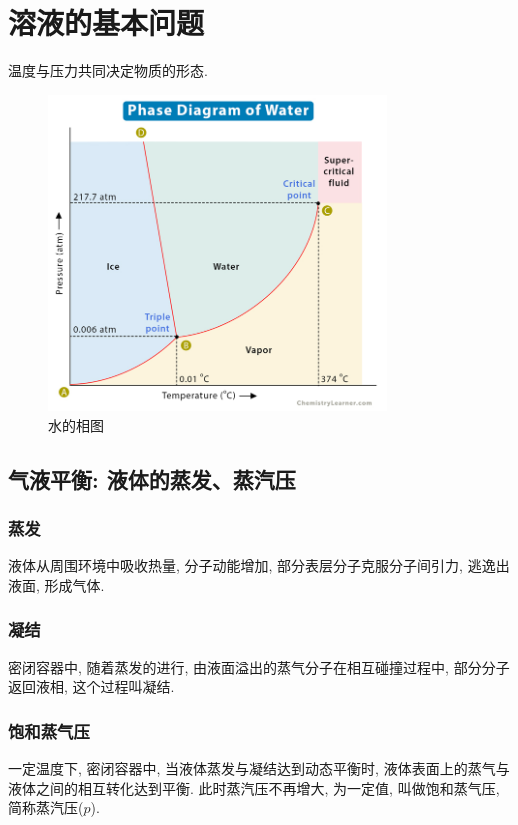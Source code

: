 \documentclass[12pt, a4paper, oneside]{ctexbook}
\begin{document}
\section{溶液的基本问题}
温度与压力共同决定物质的形态. \\
\begin{figure}[htbp]
    \centering
    \includegraphics[width=0.8\textwidth]{pics/phase_diagram.jpg}
    \caption{水的相图}
\end{figure}
\subsection{气液平衡: 液体的蒸发、蒸汽压}
\subsubsection{蒸发}
液体从周围环境中吸收热量, 分子动能增加, 部分表层分子克服分子间引力, 逃逸出液面, 形成气体. 
\subsubsection{凝结}
密闭容器中, 随着蒸发的进行, 由液面溢出的蒸气分子在相互碰撞过程中, 部分分子返回液相, 这个过程叫凝结. 
\subsubsection{饱和蒸气压}
一定温度下, 密闭容器中, 当液体蒸发与凝结达到动态平衡时, 液体表面上的蒸气与液体之间的相互转化达到平衡. 此时蒸汽压不再增大, 为一定值, 叫做饱和蒸气压, 简称蒸汽压($p$). 
\end{document}
